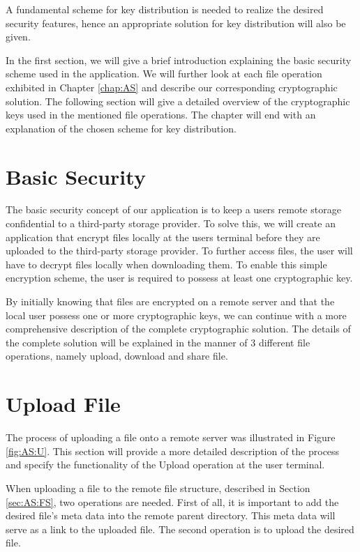 \documentclass[english,12pt,a4paper]{book}
\begin{document}
A fundamental scheme for key distribution is needed to realize the desired
security features, hence an appropriate solution for key distribution will
also be given.

In the first section, we will give a brief introduction explaining the basic security
scheme used in the application. We will further look at each file operation 
exhibited in Chapter \ref{chap:AS} and describe our corresponding cryptographic
solution. The following section will give a detailed overview of the
cryptographic keys used in the mentioned file operations. The chapter will end with an 
explanation of the chosen scheme for key distribution.

\section{Basic Security}
The basic security concept of our application is to keep a users remote storage
confidential to a third-party storage provider. To solve this, we will
create an application that encrypt files locally at the users terminal before
they are uploaded to the third-party storage provider. To further access files, the user will have
to decrypt files locally when downloading them. To enable this simple
encryption scheme, the user is required to possess at least one cryptographic key.

By initially knowing that files are encrypted on a remote server and that the local user
possess one or more cryptographic keys, we can continue with a more comprehensive
description of the complete cryptographic solution. The details of the complete
solution will be explained in the manner of 3 different file operations, namely
upload, download and share file.

\section{Upload File}
\label{sec:CS:UF}
The process of uploading a file onto a remote server was illustrated in Figure
\ref{fig:AS:U}. This section will provide a more detailed description of the
process and specify the functionality of the Upload operation at the user
terminal.

When uploading a file to the remote file structure, described in Section \ref{sec:AS:FS}, two
operations are needed. First of all, it is important to add the desired file's
meta data into the remote parent directory. This meta data will serve as a link
to the uploaded file. The second operation is to upload the desired file.
\end{document}
